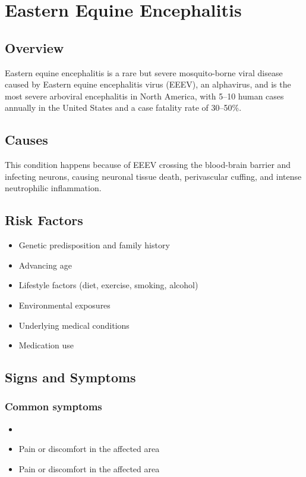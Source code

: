 \chapter{Eastern Equine Encephalitis}
\label{sec:Eastern Equine Encephalitis}

\section{Overview}
Eastern equine encephalitis is a rare but severe mosquito-borne viral disease caused by Eastern equine encephalitis virus (EEEV), an alphavirus, and is the most severe arboviral encephalitis in North America, with 5--10 human cases annually in the United States and a case fatality rate of 30--50\%.
\section{Causes}
This condition happens because of EEEV crossing the blood-brain barrier and infecting neurons, causing neuronal tissue death, perivascular cuffing, and intense neutrophilic inflammation.     
\section{Risk Factors}

\begin{itemize}[noitemsep]
  \item Genetic predisposition and family history
  \item Advancing age
  \item Lifestyle factors (diet, exercise, smoking, alcohol)
  \item Environmental exposures
  \item Underlying medical conditions
  \item Medication use
\end{itemize}
\section{Signs and Symptoms}

\subsection{Common symptoms}
\begin{itemize}[noitemsep]
  \item \item Pain or discomfort in the affected area    \item Pain or discomfort in the affected area
  \end{itemize}

